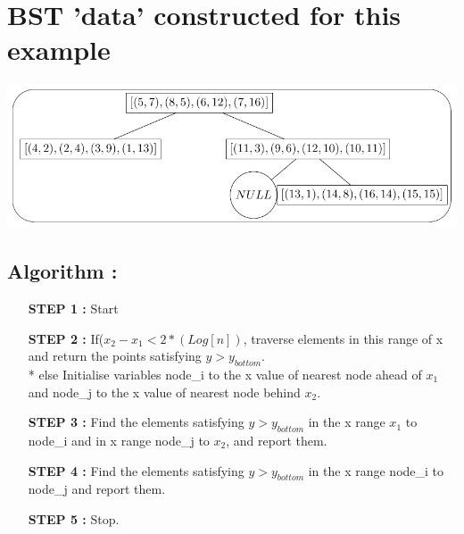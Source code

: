 \documentclass{article}
\begin{document}
\section*{BST 'data' constructed for this example}
\includegraphics[scale=1]{bst.pdf}
\subsection{Algorithm : }
\begin{itemize}
\item[\bf STEP 1 : ]
Start
\item[\bf STEP 2 : ]
If($x_2 - x_1 < 2*(Log[n]) $, traverse elements in this range of x and return the points satisfying $y > y_{bottom}$. \\*
else Initialise variables node\_i to the x value of nearest node ahead of $x_1$ and node\_j to the x value of nearest node behind $x_2$.
\item[\bf STEP 3 : ]
Find the elements satisfying $y > y_{bottom}$ in the x range $x_1$ to node\_i and in x range node\_j to $x_2$, and report them.
\item[\bf STEP 4 : ]
Find the elements satisfying $y > y_{bottom}$ in the x range node\_i to node\_j and report them.
\item[\bf STEP 5 : ]
Stop.
\end{itemize}
\end{document}
